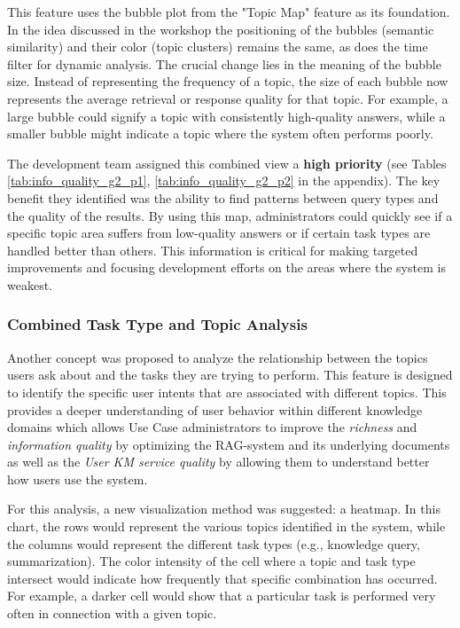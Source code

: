 \documentclass[
	english,
	ruledheaders=section,%
	class=report,%
	thesis={type=bachelor},%
	accentcolor=1b,%
	custommargins=true,%
	marginpar=false,%
	parskip=half-,%
	fontsize=11pt,%
	DIV=14,
]{tudapub}
\begin{document}
This feature uses the bubble plot from the "Topic Map" feature as its foundation. In the idea discussed in the workshop the positioning of the bubbles (semantic similarity) and their color (topic clusters) remains the same, as does the time filter for dynamic analysis. The crucial change lies in the meaning of the bubble size. Instead of representing the frequency of a topic, the size of each bubble now represents the average retrieval or response quality for that topic. For example, a large bubble could signify a topic with consistently high-quality answers, while a smaller bubble might indicate a topic where the system often performs poorly.

The development team assigned this combined view a \textbf{high priority} (see Tables \ref{tab:info_quality_g2_p1},  \ref{tab:info_quality_g2_p2} in the appendix). The key benefit they identified was the ability to find patterns between query types and the quality of the results. By using this map, administrators could quickly see if a specific topic area suffers from low-quality answers or if certain task types are handled better than others. This information is critical for making targeted improvements and focusing development efforts on the areas where the system is weakest.
\subsubsection{Combined Task Type and Topic Analysis}
Another concept was proposed to analyze the relationship between the topics users ask about and the tasks they are trying to perform. This feature is designed to identify the specific user intents that are associated with different topics. This provides a deeper understanding of user behavior within different knowledge domains which allows Use Case administrators to improve the \textit{richness} and \textit{information quality} \parencite[pp.~57--58]{Jennex2006} by optimizing the RAG-system and its underlying documents as well as the \textit{User KM service quality} \parencite[pp.~58--59]{Jennex2006} by allowing them to understand better how users use the system.

For this analysis, a new visualization method was suggested: a heatmap. In this chart, the rows would represent the various topics identified in the system, while the columns would represent the different task types (e.g., knowledge query, summarization). The color intensity of the cell where a topic and task type intersect would indicate how frequently that specific combination has occurred. For example, a darker cell would show that a particular task is performed very often in connection with a given topic.
\end{document}
